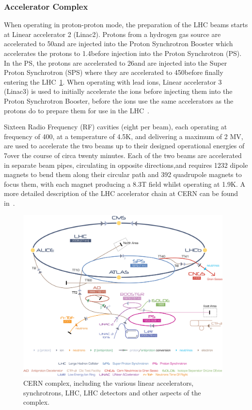 \subsubsection{Accelerator Complex}
When operating in proton-proton mode, the preparation of the LHC beams starts at Linear accelerator 2 (Linac2). 
Protons from a hydrogen gas source are accelerated to 50\MeV and are injected into the Proton Synchrotron Booster which accelerates the protons to 1.4\GeV before injection into the Proton Synchrotron (PS). 
In the PS, the protons are accelerated to 26\GeV and are injected into the Super Proton Synchrotron (SPS) where they are accelerated to 450\GeV before finally entering the LHC~\ref{fig:cern-accelerator-complex}. 
When operating with lead ions, Linear accelerator 3 (Linac3) is used to initially accelerate the ions before injecting them into the Proton Synchrotron Booster, before the ions use the same accelerators as the protons do to prepare them for use in the LHC~\cite{Bruning:782076}. 

Sixteen Radio Frequency (RF) cavities (eight per beam), each operating at frequency of 400\MHz, at a temperature of 4.5K, and delivering a maximum of 2 MV, are used to accelerate the two beams up to their designed operational energies of 7\TeV over the course of circa twenty minutes.
Each of the two beams are accelerated in separate beam pipes, circulating in opposite directions,and requires 1232 dipole magnets to bend them along their circular path and 392 quadrupole magnets to focus them, with each magnet producing a 8.3T field whilst operating at 1.9K.
A more detailed description of the LHC accelerator chain at CERN can be found in~\cite{Schindl:397574}. 

\begin{figure}[htbp]
\begin{center}
\includegraphics[width=0.97\textwidth]{figs/lhc/Cern-Accelerator-Complex.jpg}
\caption{CERN complex, including the various linear accelerators, synchrotrons, LHC, LHC detectors and other aspects of the complex.}
\label{fig:cern-accelerator-complex}
\end{center}
\end{figure}


